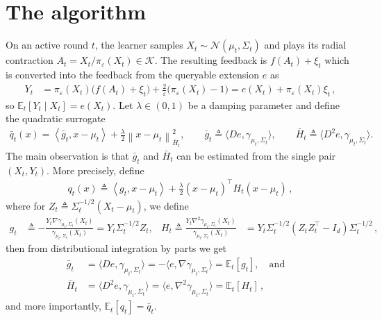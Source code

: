 \documentclass{article}
\newcommand{\E}{\mathbb E}
\newcommand{\K}{\mathcal K}
\newcommand{\N}{\mathcal N}
\newcommand{\1}{\mathbf 1}
\newcommand{\eps}{\varepsilon}
\newcommand{\ip}[2]{\left\langle #1,#2\right\rangle}
\newcommand{\normm}[2]{\left\lVert #1\right\rVert_{#2}}
\begin{document}
\section{The algorithm}
On an active round $t$, the learner samples
$X_t\sim \N(\mu_t,\Sigma_t)$ and plays its radial contraction
$A_t=X_t/\pi_\eps(X_t)\in\K$.
The resulting feedback is $f(A_t) + \xi_t$ which is converted into the feedback from the queryable extension $e$ as
\begin{align}
    Y_t
     & =
    \pi_\eps(X_t)\bigl(f(A_t)+\xi_t\bigr)
    +\frac2\eps\bigl(\pi_\eps(X_t)-1\bigr)
    =e(X_t)+\pi_\eps(X_t)\xi_t\,,
    \label{eq:Y}
\end{align}
so $\E_t[Y_t\mid X_t]=e(X_t)$.
Let $\lambda \in (0,1)$ be a damping parameter and define the quadratic surrogate
\begin{align}
    \bar{q}_t(x)
    =
    \ip{\bar{g}_t}{x-\mu_t}
    +\frac\lambda2\normm{x-\mu_t}{\bar{H}_t}^2,
    \qquad
    \bar{g}_t\triangleq \langle De,\gamma_{\mu_t,\Sigma_t}\rangle,
    \qquad
    \bar{H}_t\triangleq \langle D^2e,\gamma_{\mu_t,\Sigma_t}\rangle.
\end{align}
The main observation is that $\bar{g}_t$ and $\bar{H}_t$ can be estimated from the single pair $(X_t, Y_t)$.
More precisely, define
\begin{align}
    q_t(x)
    \triangleq
    \ip{g_t}{x-\mu_t}
    +
    \frac\lambda2(x-\mu_t)^\top H_t(x-\mu_t)\,,
\end{align}
where for $Z_t\triangleq\Sigma_t^{-1/2}(X_t-\mu_t)$, we define
\begin{align}
    g_t
     & \triangleq - \frac{Y_t \nabla \gamma_{\mu_t,\Sigma_t}(X_t)}{\gamma_{\mu_t,\Sigma_t}(X_t)}
    =
    Y_t\Sigma_t^{-1/2}Z_t,
     &
    H_t \triangleq
    \frac{Y_t \nabla^2 \gamma_{\mu_t,\Sigma_t}(X_t)}{\gamma_{\mu_t,\Sigma_t}(X_t)}
     & =Y_t\Sigma_t^{-1/2}(Z_tZ_t^\top-I_d)\Sigma_t^{-1/2}\,,
    \label{eq:sampled-hermite-coefficients}
\end{align}
then from distributional integration by parts we get
\begin{align}
    \bar{g}_t & = \langle De, \gamma_{\mu_t,\Sigma_t}\rangle
    = - \langle e, \nabla \gamma_{\mu_t,\Sigma_t}\rangle
    = \E_t[g_t],
    \quad\text{and}\quad\nonumber                              \\
    \bar{H}_t & = \langle D^2e, \gamma_{\mu_t,\Sigma_t}\rangle
    = \langle e, \nabla^2 \gamma_{\mu_t,\Sigma_t}\rangle
    = \E_t[H_t]\,,
    \label{eq:sampled-hermite-unbiasedness}
\end{align}
and more importantly, $\E_t[q_t]=\bar{q}_t$.
\end{document}
